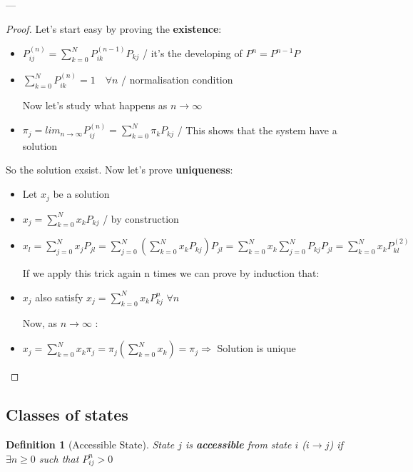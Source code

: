 \documentclass[a4paper,12pt]{report}
\newtheorem{definition}{Definition}
\begin{document}
---
\begin{proof} Let's start easy by proving the {\bfseries existence}:

\begin{itemize}
\item$ P_{i j}^{(n)} = \sum_{k=0}^N P_{ik}^{(n-1)} P_{k j}$ \qquad / it's the developing of $P^n = P^{n-1} P$
\item$ \sum_{k=0}^N P_{ik}^{(n)} = 1 \quad \forall n$ \qquad / normalisation condition

Now let's study what happens as $ n \to \infty $
\item $\pi_j = lim_{n \to \infty} P_{ij}^{(n)} = \sum_{k=0}^N \pi_k P_{kj}$ / This shows that the system have a solution

\end{itemize}

So the solution exsist. Now let's prove {\bfseries uniqueness}:


\begin{itemize}

\item Let $x_j$ be a solution
\item $x_j = \sum_{k=0}^N x_k P_{kj} $ / by construction
\item $x_l = \sum_{j=0}^N x_j P_{jl} =  \sum_{j=0}^N ( \sum_{k=0}^N x_k P_{kj} ) P_{jl} =  \sum_{k=0}^N x_k \sum_{j=0}^N P_{kj} P_{jl} = \sum_{k=0}^N x_k P_{kl}^{(2)}$

If we apply this trick again n times we can prove by induction  that:

\item $x_j$ also satisfy $ x_j = \sum_{k=0}^N x_k P_{kj}^n $ \quad  $\forall n $

Now, as $n \to \infty$ : 

\item  $x_j = \sum_{k=0}^N x_k \pi_j = \pi_j (\sum_{k=0}^N x_k) = \pi_j  \Rightarrow $ Solution is unique

\end{itemize}

\end{proof}

\subsection{Classes of states}
\begin{definition}[Accessible State] 

State $j$ is {\bfseries accessible} from state $i$ ($i \rightarrow j$) if $\exists n \geq 0$ such that $P_{ij}^n > 0$
\end{definition}
\end{document}
